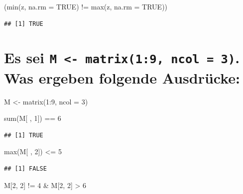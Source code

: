 \documentclass[12pt,a4paper]{article}
\newenvironment{Shaded}{\begin{snugshade}}{\end{snugshade}}
\newcommand{\AttributeTok}[1]{\textcolor[rgb]{0.77,0.63,0.00}{#1}}
\newcommand{\ConstantTok}[1]{\textcolor[rgb]{0.00,0.00,0.00}{#1}}
\newcommand{\DecValTok}[1]{\textcolor[rgb]{0.00,0.00,0.81}{#1}}
\newcommand{\FunctionTok}[1]{\textcolor[rgb]{0.00,0.00,0.00}{#1}}
\newcommand{\NormalTok}[1]{#1}
\newcommand{\OtherTok}[1]{\textcolor[rgb]{0.56,0.35,0.01}{#1}}
\newcommand{\SpecialCharTok}[1]{\textcolor[rgb]{0.00,0.00,0.00}{#1}}
\begin{document}
\begin{Shaded}
\begin{Highlighting}[]
\NormalTok{    (}\FunctionTok{min}\NormalTok{(z, }\AttributeTok{na.rm =} \ConstantTok{TRUE}\NormalTok{) }\SpecialCharTok{!=} \FunctionTok{max}\NormalTok{(z, }\AttributeTok{na.rm =} \ConstantTok{TRUE}\NormalTok{))}
\end{Highlighting}
\end{Shaded}

\begin{verbatim}
## [1] TRUE
\end{verbatim}

\hypertarget{es-sei-m---matrix19-ncol-3.-was-ergeben-folgende-ausdruxfccke}{%
\section{\texorpdfstring{Es sei
\texttt{M\ \textless{}-\ matrix(1:9,\ ncol\ =\ 3)}. Was ergeben folgende
Ausdrücke:}{Es sei M \textless- matrix(1:9, ncol = 3). Was ergeben folgende Ausdrücke:}}\label{es-sei-m---matrix19-ncol-3.-was-ergeben-folgende-ausdruxfccke}}

\begin{Shaded}
\begin{Highlighting}[]
\NormalTok{    M }\OtherTok{\textless{}{-}} \FunctionTok{matrix}\NormalTok{(}\DecValTok{1}\SpecialCharTok{:}\DecValTok{9}\NormalTok{, }\AttributeTok{ncol =} \DecValTok{3}\NormalTok{)}
    
    \FunctionTok{sum}\NormalTok{(M[ , }\DecValTok{1}\NormalTok{]) }\SpecialCharTok{==} \DecValTok{6}
\end{Highlighting}
\end{Shaded}

\begin{verbatim}
## [1] TRUE
\end{verbatim}

\begin{Shaded}
\begin{Highlighting}[]
    \FunctionTok{max}\NormalTok{(M[ , }\DecValTok{2}\NormalTok{]) }\SpecialCharTok{\textless{}=} \DecValTok{5}
\end{Highlighting}
\end{Shaded}

\begin{verbatim}
## [1] FALSE
\end{verbatim}

\begin{Shaded}
\begin{Highlighting}[]
\NormalTok{    M[}\DecValTok{2}\NormalTok{, }\DecValTok{2}\NormalTok{] }\SpecialCharTok{!=} \DecValTok{4} \SpecialCharTok{\&}\NormalTok{ M[}\DecValTok{2}\NormalTok{, }\DecValTok{2}\NormalTok{] }\SpecialCharTok{\textgreater{}} \DecValTok{6}
\end{Highlighting}
\end{Shaded}
\end{document}
